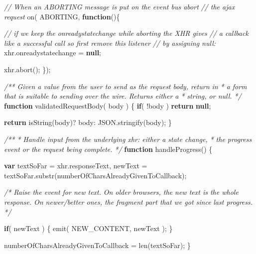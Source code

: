 \documentclass[]{article}
\newenvironment{Shaded}{}{}
\newcommand{\KeywordTok}[1]{\textcolor[rgb]{0.00,0.44,0.13}{\textbf{{#1}}}}
\newcommand{\CommentTok}[1]{\textcolor[rgb]{0.38,0.63,0.69}{\textit{{#1}}}}
\newcommand{\OtherTok}[1]{\textcolor[rgb]{0.00,0.44,0.13}{{#1}}}
\newcommand{\FunctionTok}[1]{\textcolor[rgb]{0.02,0.16,0.49}{{#1}}}
\newcommand{\NormalTok}[1]{{#1}}
\begin{document}
\begin{Shaded}
\begin{Highlighting}[]
   \CommentTok{// When an ABORTING message is put on the event bus abort }
   \CommentTok{// the ajax request         }
   \FunctionTok{on}\NormalTok{( ABORTING, }\KeywordTok{function}\NormalTok{()\{}
  
      \CommentTok{// if we keep the onreadystatechange while aborting the XHR gives }
      \CommentTok{// a callback like a successful call so first remove this listener}
      \CommentTok{// by assigning null:}
      \OtherTok{xhr}\NormalTok{.}\FunctionTok{onreadystatechange} \NormalTok{= }\KeywordTok{null}\NormalTok{;}
            
      \OtherTok{xhr}\NormalTok{.}\FunctionTok{abort}\NormalTok{();}
   \NormalTok{\});}

   \CommentTok{/** Given a value from the user to send as the request body, return in}
\CommentTok{    *  a form that is suitable to sending over the wire. Returns either a }
\CommentTok{    *  string, or null.        }
\CommentTok{    */}
   \KeywordTok{function} \FunctionTok{validatedRequestBody}\NormalTok{( body ) \{}
      \KeywordTok{if}\NormalTok{( !body )}
         \KeywordTok{return} \KeywordTok{null}\NormalTok{;}
   
      \KeywordTok{return} \FunctionTok{isString}\NormalTok{(body)? body: }\OtherTok{JSON}\NormalTok{.}\FunctionTok{stringify}\NormalTok{(body);}
   \NormalTok{\}      }

   \CommentTok{/** }
\CommentTok{    * Handle input from the underlying xhr: either a state change,}
\CommentTok{    * the progress event or the request being complete.}
\CommentTok{    */}
   \KeywordTok{function} \FunctionTok{handleProgress}\NormalTok{() \{}
                        
      \KeywordTok{var} \NormalTok{textSoFar = }\OtherTok{xhr}\NormalTok{.}\FunctionTok{responseText}\NormalTok{,}
          \NormalTok{newText = }\OtherTok{textSoFar}\NormalTok{.}\FunctionTok{substr}\NormalTok{(numberOfCharsAlreadyGivenToCallback);}
      
      
      \CommentTok{/* Raise the event for new text.}
\CommentTok{      }
\CommentTok{         On older browsers, the new text is the whole response. }
\CommentTok{         On newer/better ones, the fragment part that we got since }
\CommentTok{         last progress. */}
         
      \KeywordTok{if}\NormalTok{( newText ) \{}
         \FunctionTok{emit}\NormalTok{( NEW_CONTENT, newText );}
      \NormalTok{\} }

      \NormalTok{numberOfCharsAlreadyGivenToCallback = }\FunctionTok{len}\NormalTok{(textSoFar);}
   \NormalTok{\}}
   

\end{Highlighting}
\end{Shaded}
\end{document}
